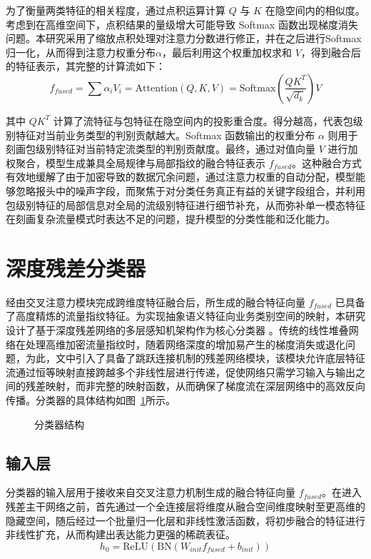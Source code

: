 为了衡量两类特征的相关程度，通过点积运算计算 $Q$ 与 $K$ 在隐空间内的相似度。考虑到在高维空间下，点积结果的量级增大可能导致 Softmax 函数出现梯度消失问题。本研究采用了缩放点积处理对注意力分数进行修正，并在之后进行Softmax归一化，从而得到注意力权重分布$\alpha$，最后利用这个权重加权求和 $V$，得到融合后的特征表示，其完整的计算流如下：
\begin{equation}
f_{fused} = \sum \alpha_i V_i = \text{Attention}(Q, K, V) = \text{Softmax}\left(\frac{QK^T}{\sqrt{d_k}}\right)V
  \label{eq:attention2}
\end{equation}

其中 $QK^T$ 计算了流特征与包特征在隐空间内的投影重合度。得分越高，代表包级别特征对当前业务类型的判别贡献越大。Softmax 函数输出的权重分布 $\alpha$ 则用于刻画包级别特征对当前特定流类型的判别贡献度。最终，通过对值向量 $V$ 进行加权聚合，模型生成兼具全局规律与局部指纹的融合特征表示 $f_{fused}$。这种融合方式有效地缓解了由于加密导致的数据冗余问题，通过注意力权重的自动分配，模型能够忽略报头中的噪声字段，而聚焦于对分类任务真正有益的关键字段组合，并利用包级别特征的局部信息对全局的流级别特征进行细节补充，从而弥补单一模态特征在刻画复杂流量模式时表达不足的问题，提升模型的分类性能和泛化能力。

\section{深度残差分类器}
经由交叉注意力模块完成跨维度特征融合后，所生成的融合特征向量 $f_{fused}$ 已具备了高度精炼的流量指纹特征。为实现抽象语义特征向业务类别空间的映射，本研究设计了基于深度残差网络的多层感知机架构作为核心分类器 。传统的线性堆叠网络在处理高维加密流量指纹时，随着网络深度的增加易产生的梯度消失或退化问题，为此，文中引入了具备了跳跃连接机制的残差网络模块，该模块允许底层特征流通过恒等映射直接跨越多个非线性层进行传递，促使网络只需学习输入与输出之间的残差映射，而非完整的映射函数，从而确保了梯度流在深层网络中的高效反向传播。分类器的具体结构如图~\ref{fig:sort}所示。
\begin{figure}[ht]
  \centering
  \caption{分类器结构}
  \label{fig:sort}
\end{figure}

\subsection{输入层}
分类器的输入层用于接收来自交叉注意力机制生成的融合特征向量 $f_{fused}$。在进入残差主干网络之前，首先通过一个全连接层将维度从融合空间维度映射至更高维的隐藏空间，随后经过一个批量归一化层和非线性激活函数，将初步融合的特征进行非线性扩充，从而构建出表达能力更强的稀疏表征。
\begin{equation}
h_0 = \text{ReLU}(\text{BN}(W_{init}f_{fused} + b_{init}))
  \label{eq:input}
\end{equation}

